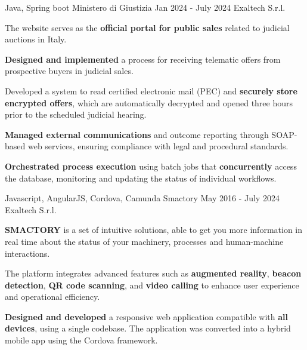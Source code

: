 \begin{cventries}
  \cventry
    {Java, Spring boot} %
    {Ministero di Giustizia} %
    {Jan 2024 - July 2024} %
    {Exaltech S.r.l.} %
    {
      \begin{cvitems} %
        \item {The website serves as the \textbf{official portal for public sales} related to judicial auctions in Italy.}
        \item {\textbf{Designed and implemented} a process for receiving telematic offers from prospective buyers in judicial sales.}
        \item {Developed a system to read certified electronic mail (PEC) and \textbf{securely store encrypted offers}, which are automatically decrypted and opened three hours prior to the scheduled judicial hearing.}  
        \item {\textbf{Managed external communications} and outcome reporting through SOAP-based web services, ensuring compliance with legal and procedural standards.}  
        \item {\textbf{Orchestrated process execution} using batch jobs that \textbf{concurrently} access the database, monitoring and updating the status of individual workflows.}  
      \end{cvitems}
    }

  \cventry
    {Javascript, AngularJS, Cordova, Camunda} %
    {Smactory} %
    {May 2016 - July 2024} %
    {Exaltech S.r.l.} %
    {
      \begin{cvitems} %
        \item {\textbf{SMACTORY} is a set of intuitive solutions, able to get you more information in real time about the status of your machinery, processes and human-machine interactions.}
        \item {The platform integrates advanced features such as \textbf{augmented reality}, \textbf{beacon detection}, \textbf{QR code scanning}, and \textbf{video calling} to enhance user experience and operational efficiency.}  
        \item {\textbf{Designed and developed} a responsive web application compatible with \textbf{all devices}, using a single codebase. The application was converted into a hybrid mobile app using the Cordova framework.}  
      \end{cvitems}
    }
\end{cventries}
